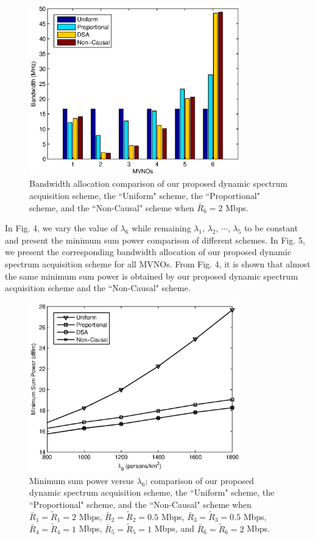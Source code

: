 \documentclass[journal]{IEEEtran}
\begin{document}
\begin{figure}
\centering
\includegraphics[width=3.6in]{fig3.eps}
\caption{Bandwidth allocation comparison of our proposed dynamic spectrum acquisition scheme, the ``Uniform" scheme, the ``Proportional" scheme, and the ``Non-Causal" scheme when $\bar{R}_6=2$ Mbps.}
\end{figure}

In Fig. 4, we vary the value of $\lambda_6$ while remaining $\lambda_1$, $\lambda_2$, $\cdots$, $\lambda_5$ to be constant and present the minimum sum power comparison of different schemes. In Fig. 5, we present the corresponding bandwidth allocation of our proposed dynamic spectrum acquisition scheme for all MVNOs. From Fig. 4, it is shown that almost the same minimum sum power is obtained by our proposed dynamic spectrum acquisition scheme and the ``Non-Causal" scheme.

\begin{figure}
\centering
\includegraphics[width=3.6in]{fig4.eps}
\caption{Minimum sum power versus $\lambda_6$; comparison of our proposed dynamic spectrum acquisition scheme, the ``Uniform" scheme, the ``Proportional" scheme, and the ``Non-Causal" scheme when $\bar{R}_1 =\tilde{R}_1=2$ Mbps, $\bar{R}_2 =\tilde{R}_2=0.5$ Mbps, $\bar{R}_3=\tilde{R}_3=0.5$ Mbps, $\bar{R}_4 =\tilde{R}_4=1$ Mbps, $\bar{R}_5=\tilde{R}_5=1$ Mbps, and $\bar{R}_6 =\tilde{R}_6=2$ Mbps.}
\end{figure}
\end{document}
